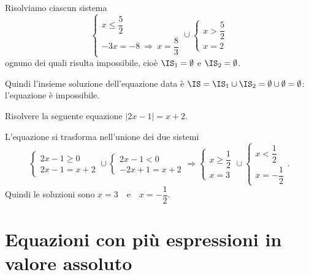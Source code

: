 \begin{exrig}
\begin{esempio}
Risolviamo ciascun sistema 
\[\left\{\begin{array}{l}{x\le \dfrac 5 2}\\{-3x=-8\:\Rightarrow\: x=\dfrac 8 3}\end{array}\right.\cup \left\{\begin{array}{l}{x>\dfrac 5 2}\\{x=2}\end{array}\right.\] 
ognuno dei quali risulta impossibile, cioè $\IS_1=\emptyset$ e $\IS_2=\emptyset $.

Quindi l'insieme soluzione dell'equazione data è $\IS=\IS_1\cup \IS_2=\emptyset \cup \emptyset =\emptyset $: l'equazione è impossibile.
\end{esempio}

\begin{esempio}
Risolvere la seguente equazione $\left|2x-1\right|=x+2$.

L'equazione si trasforma nell'unione dei due sistemi 
\[ \left\{\begin{array}{l}{2x-1\ge 0}\\{2x-1=x+2}\end{array}\right.\cup \left\{\begin{array}{l}{2x-1<0}\\{-2x+1=x+2}\end{array}\right.\Rightarrow
\left\{\begin{array}{l}{x\ge \dfrac 1 2}\\{x=3}\end{array}\right.\cup \left\{\begin{array}{l}{x<\dfrac 1 2}\\{x=-\dfrac 1 2}\end{array}\right..\] 
Quindi le soluzioni sono $x=3$~~e~~$x=-\dfrac 1 2$.
\end{esempio}
\end{exrig}
\ovalbox{\risolvii \ref{ese:7.8}, \ref{ese:7.9}, \ref{ese:7.10}, \ref{ese:7.11}, \ref{ese:7.12}, \ref{ese:7.13}, \ref{ese:7.14}, \ref{ese:7.15}, \ref{ese:7.16}}

\section{Equazioni con più espressioni in valore assoluto}

